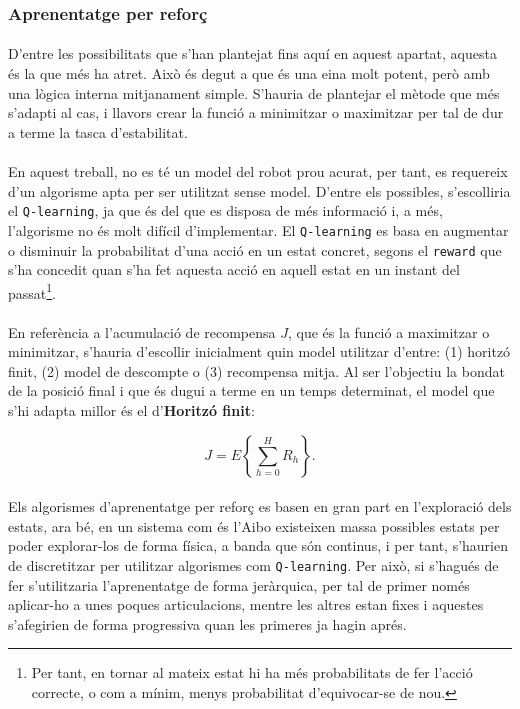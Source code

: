 \documentclass[12pt,a4paper,final,twoside]{article}
\begin{document}
\subsubsection{Aprenentatge per reforç}
\paragraph{}D'entre les possibilitats que s'han plantejat fins aquí en aquest apartat, aquesta és la que més ha atret. Això és degut a que és una eina molt potent, però amb una lògica interna mitjanament simple. S'hauria de plantejar el mètode que més s'adapti al cas, i llavors crear la funció a minimitzar o maximitzar per tal de dur a terme la tasca d'estabilitat.

\paragraph{}En aquest treball, no es té un model del robot prou acurat, per tant, es requereix d'un algorisme apta per ser utilitzat sense model. D'entre els possibles, s'escolliria el \texttt{Q-learning}, ja que és del que es disposa de més informació i, a més, l'algorisme no és molt difícil d'implementar. El \texttt{Q-learning} es basa en augmentar o disminuir la probabilitat d'una acció en un estat concret, segons el \texttt{reward} que s'ha concedit quan s'ha fet aquesta acció en aquell estat en un instant del passat\footnote{Per tant, en tornar al mateix estat hi ha més probabilitats de fer l'acció correcte, o com a mínim, menys probabilitat d'equivocar-se de nou.}.

\paragraph{}En referència a l'acumulació de recompensa $J$, que és la funció a maximitzar o minimitzar, s'hauria d'escollir inicialment quin model utilitzar d'entre: (1) horitzó finit, (2) model de descompte o (3) recompensa mitja. Al ser l'objectiu la bondat de la posició final i que és dugui a terme en un temps determinat, el model que s'hi adapta millor és el d'\textbf{Horitzó finit}:

\begin{equation}
J=E\left\{ \sum_{h=0}^{H} R_{h} \right\}.
\end{equation}

\paragraph{}Els algorismes d'aprenentatge per reforç es basen en gran part en l'exploració dels estats, ara bé, en un sistema com és l'Aibo existeixen massa possibles estats per poder explorar-los de forma física, a banda que són continus, i per tant, s'haurien de discretitzar per utilitzar algorismes com \texttt{Q-learning}. Per això, si s'hagués de fer s'utilitzaria l'aprenentatge de forma jeràrquica, per tal de primer només aplicar-ho a unes poques articulacions, mentre les altres estan fixes i aquestes s'afegirien de forma progressiva quan les primeres ja hagin aprés. 
\end{document}
